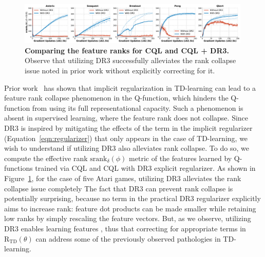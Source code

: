 \begin{figure}[H]
    \centering
    \includegraphics[width=0.99\textwidth]{chapters/dr3/figures_iclr/rank_trends_dr3_cql.pdf}
    \vspace{-5pt}
    \caption{\footnotesize{\label{fig:rank_trends_5_games} \textbf{Comparing the feature ranks for CQL and CQL + DR3.} Observe that utilizing DR3 successfully alleviates the rank collapse issue noted in prior work without explicitly correcting for it.}}
\end{figure}
Prior work~\citep{kumar2021implicit} has shown that implicit regularization in TD-learning can lead to a feature rank collapse phenomenon in the Q-function, which hinders the Q-function from using its full representational capacity. Such a phenomenon is absent in supervised learning, where the feature rank does not collapse. Since DR3 is inspired by mitigating the effects of the term in the implicit regularizer (Equation~\ref{eqn:regularizer}) that only appears in the case of TD-learning, we wish to understand if utilizing DR3 also alleviates rank collapse. To do so, we compute the effective rank $\mathrm{srank}_\delta(\phi)$ metric of the features learned by Q-functions trained via CQL and CQL with DR3 explicit regularizer. As shown in Figure~\ref{fig:rank_trends_5_games}, for the case of five Atari games, utilizing DR3 alleviates the rank collapse issue completely  The fact that DR3 can prevent rank collapse is potentially surprising, because no term in the practical DR3 regularizer explicitly aims to increase rank: feature dot products can be made smaller while retaining low ranks by simply rescaling the feature vectors. But, as we observe, utilizing DR3 enables learning features , thus  that correcting for appropriate terms in $\mathrm{R}_\mathrm{TD}(\theta)$ can address some of the previously observed pathologies in TD-learning. 


